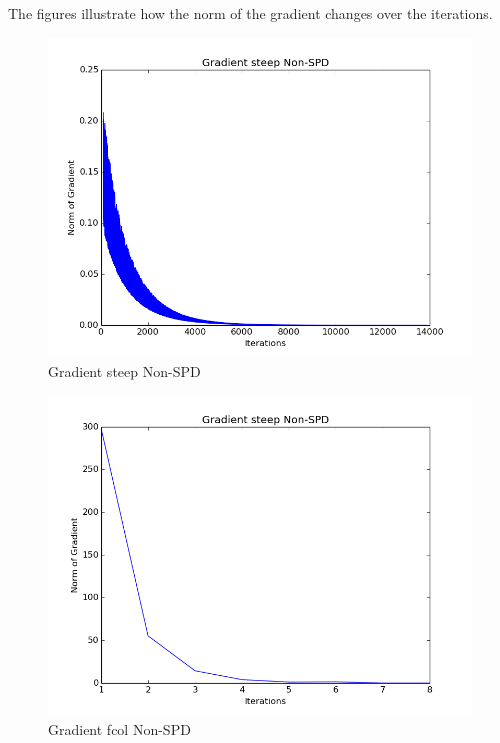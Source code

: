 \documentclass{article}
\begin{document}
The figures illustrate how the norm of the gradient changes over the iterations.
\begin{figure}[H]
  \centering
  \includegraphics[scale=0.5]{steepnspd.png}
  \caption{Gradient steep Non-SPD}
\end{figure}
\begin{figure}[H]
  \centering
  \includegraphics[scale=0.5]{fcolnspd.png}
  \caption{Gradient fcol Non-SPD}
\end{figure}
\end{document}
